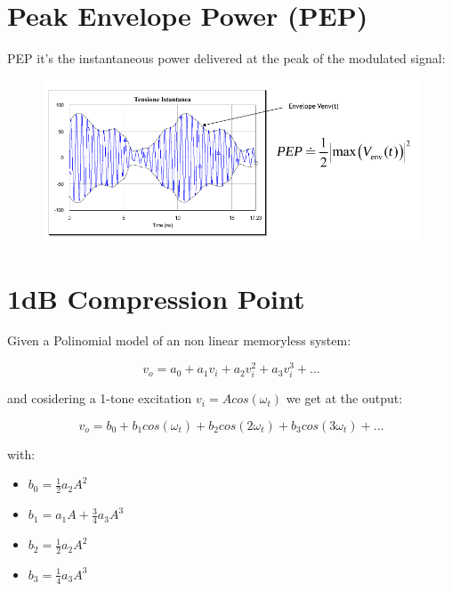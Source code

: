 
\section{Peak Envelope Power (PEP)} %
\label{sub:peak_envelope_power_pep_}

PEP it's the instantaneous power delivered at the peak of the modulated signal:


\begin{figure}[h]
	\centering
	\includegraphics[scale=0.5]{Immagini/pep}
	
	\label{fig:link}
\end{figure}


\section{1dB Compression Point} %
\label{sec:1db_compression_point}

Given a Polinomial model of an non linear memoryless system:

\begin{equation}
	v_o=a_0+a_1v_i+a_2v_i^2+a_3v_i^3+...
\end{equation}

and cosidering a 1-tone excitation $v_i=Acos(\omega_t) $ we get at the output:

\begin{equation}
	v_o=b_0+b_1cos(\omega_t) +b_2cos(2\omega_t) +b_3cos(3\omega_t) +...
\end{equation}

with:

\begin{itemize}
	\item $b_0= \frac{1}{2}a_2A^2$

	\item $b_1= a_1A+\frac{3}{4}a_3A^3$

	\item $b_2= \frac{1}{2}a_2A^2$

	\item $b_3= \frac{1}{4}a_3A^3$
\end{itemize}


